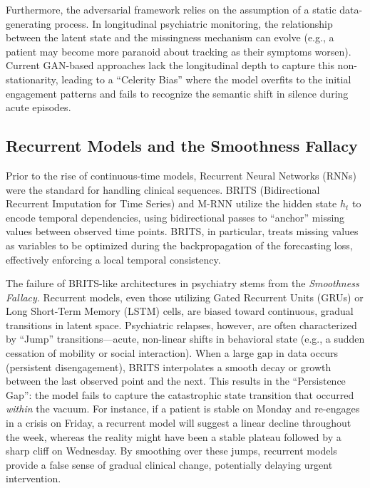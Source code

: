 Furthermore, the adversarial framework relies on the assumption of a static data-generating process. In longitudinal psychiatric monitoring, the relationship between the latent state and the missingness mechanism can evolve (e.g., a patient may become more paranoid about tracking as their symptoms worsen). Current GAN-based approaches lack the longitudinal depth to capture this non-stationarity, leading to a ``Celerity Bias'' where the model overfits to the initial engagement patterns and fails to recognize the semantic shift in silence during acute episodes.

\subsection{Recurrent Models and the Smoothness Fallacy}

Prior to the rise of continuous-time models, Recurrent Neural Networks (RNNs) were the standard for handling clinical sequences. BRITS (Bidirectional Recurrent Imputation for Time Series) \cite{cao2018brits} and M-RNN \cite{yoon2018mrnn} utilize the hidden state $h_t$ to encode temporal dependencies, using bidirectional passes to ``anchor'' missing values between observed time points. BRITS, in particular, treats missing values as variables to be optimized during the backpropagation of the forecasting loss, effectively enforcing a local temporal consistency.

The failure of BRITS-like architectures in psychiatry stems from the \textit{Smoothness Fallacy}. Recurrent models, even those utilizing Gated Recurrent Units (GRUs) or Long Short-Term Memory (LSTM) cells, are biased toward continuous, gradual transitions in latent space. Psychiatric relapses, however, are often characterized by ``Jump'' transitions—acute, non-linear shifts in behavioral state (e.g., a sudden cessation of mobility or social interaction). When a large gap in data occurs (persistent disengagement), BRITS interpolates a smooth decay or growth between the last observed point and the next. This results in the ``Persistence Gap'': the model fails to capture the catastrophic state transition that occurred \textit{within} the vacuum. For instance, if a patient is stable on Monday and re-engages in a crisis on Friday, a recurrent model will suggest a linear decline throughout the week, whereas the reality might have been a stable plateau followed by a sharp cliff on Wednesday. By smoothing over these jumps, recurrent models provide a false sense of gradual clinical change, potentially delaying urgent intervention.

